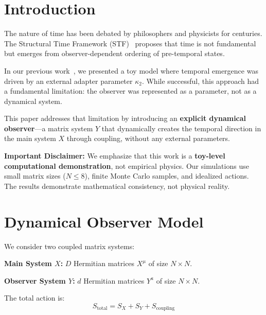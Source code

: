 \documentclass[12pt,a4paper]{article}
\begin{document}
\section{Introduction}\label{sec:intro}

The nature of time has been debated by philosophers and physicists for 
centuries. The Structural Time Framework (STF)~\cite{chanpengpad_stf} 
proposes that time is not fundamental but emerges from observer-dependent 
ordering of pre-temporal states.

In our previous work~\cite{chanpengpad_sgoed_v2}, we presented a toy 
model where temporal emergence was driven by an external adapter parameter 
$\kappa_2$. While successful, this approach had a fundamental limitation: 
the observer was represented as a parameter, not as a dynamical system.

This paper addresses that limitation by introducing an \textbf{explicit 
dynamical observer}---a matrix system $Y$ that dynamically creates the 
temporal direction in the main system $X$ through coupling, without any 
external parameters.

\textbf{Important Disclaimer:} We emphasize that this work is a 
\textbf{toy-level computational demonstration}, not empirical physics. 
Our simulations use small matrix sizes ($N \leq 8$), finite Monte Carlo 
samples, and idealized actions. The results demonstrate mathematical 
consistency, not physical reality.

\section{Dynamical Observer Model}\label{sec:model}

We consider two coupled matrix systems:

\textbf{Main System $X$:} $D$ Hermitian matrices $X^\mu$ of size $N \times N$.

\textbf{Observer System $Y$:} $d$ Hermitian matrices $Y^a$ of size $N \times N$.

The total action is:
\begin{equation}
S_{\text{total}} = S_X + S_Y + S_{\text{coupling}}
\end{equation}
\end{document}
